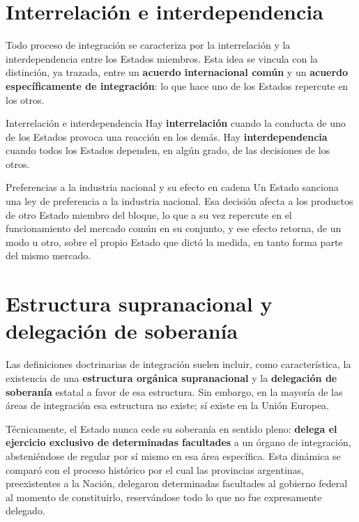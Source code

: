 \documentclass[12pt,oneside]{book}
\begin{document}
\section{Interrelación e interdependencia}

Todo proceso de integración se caracteriza por la interrelación y la interdependencia entre los Estados miembros. Esta idea se vincula con la distinción, ya trazada, entre un \textbf{acuerdo internacional común} y un \textbf{acuerdo específicamente de integración}: lo que hace uno de los Estados repercute en los otros.

\begin{definition}{Interrelación e interdependencia}
Hay \textbf{interrelación} cuando la conducta de uno de los Estados provoca una reacción en los demás. Hay \textbf{interdependencia} cuando todos los Estados dependen, en algún grado, de las decisiones de los otros.
\end{definition}

\begin{example}{Preferencias a la industria nacional y su efecto en cadena}
Un Estado sanciona una ley de preferencia a la industria nacional. Esa decisión afecta a los productos de otro Estado miembro del bloque, lo que a su vez repercute en el funcionamiento del mercado común en su conjunto, y ese efecto retorna, de un modo u otro, sobre el propio Estado que dictó la medida, en tanto forma parte del mismo mercado.
\end{example}

\section{Estructura supranacional y delegación de soberanía}

Las definiciones doctrinarias de integración suelen incluir, como característica, la existencia de una \textbf{estructura orgánica supranacional} y la \textbf{delegación de soberanía} estatal a favor de esa estructura. Sin embargo, en la mayoría de las áreas de integración esa estructura no existe; sí existe en la Unión Europea.

Técnicamente, el Estado nunca cede su soberanía en sentido pleno: \textbf{delega el ejercicio exclusivo de determinadas facultades} a un órgano de integración, absteniéndose de regular por sí mismo en esa área específica. Esta dinámica se comparó con el proceso histórico por el cual las provincias argentinas, preexistentes a la Nación, delegaron determinadas facultades al gobierno federal al momento de constituirlo, reservándose todo lo que no fue expresamente delegado.
\end{document}
